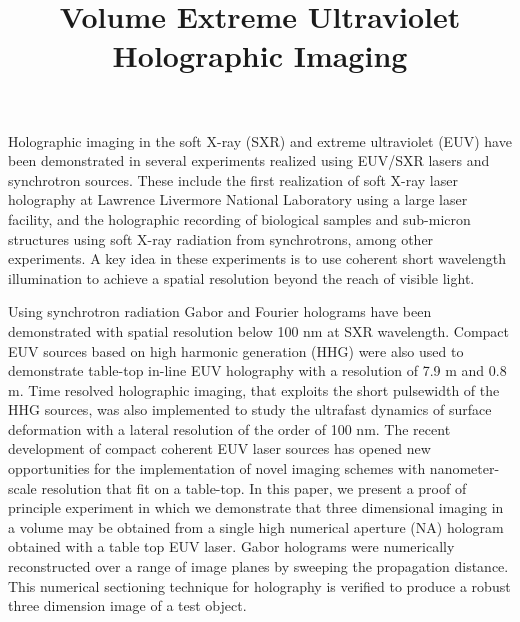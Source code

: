 \documentclass[12pt]{article}
\title{Volume Extreme Ultraviolet Holographic Imaging}
\begin{document}
\maketitle
  Holographic imaging in the soft X-ray \cite{Johansson03compactsoft} (SXR) and extreme ultraviolet (EUV) have been demonstrated in several experiments realized using EUV/SXR lasers and synchrotron sources. These include the first realization of soft X-ray laser holography at Lawrence Livermore National Laboratory using a large laser facility, and the holographic recording of biological samples and sub-micron structures using soft X-ray radiation from synchrotrons, among other experiments.  A key idea in these experiments is to use coherent short wavelength illumination to achieve a spatial resolution \cite{Friedt_spatialresolution} beyond the reach of visible light.  

Using synchrotron radiation Gabor and Fourier holograms have been demonstrated with spatial resolution below 100 nm at SXR wavelength.  Compact EUV sources based on high harmonic generation (HHG) were also used to demonstrate table-top in-line EUV holography with a resolution of 7.9 m and 0.8 m.  Time resolved holographic imaging, that exploits the short pulsewidth of the HHG sources, was also implemented to study the ultrafast dynamics of surface deformation with a lateral resolution of the order of 100 nm.  The recent development of compact coherent EUV laser \cite{Newsroom_testingeuv} sources has opened new opportunities for the implementation of novel imaging schemes with nanometer-scale resolution that fit on a table-top. In this paper, we present a proof of principle experiment in which we demonstrate that three dimensional imaging in a volume may be obtained from a single high numerical  aperture (NA) hologram obtained with a table top EUV laser. Gabor holograms were numerically reconstructed over a range of image planes by sweeping the propagation distance. This numerical sectioning technique for holography is verified to produce a robust three dimension image of a test object. 

 
\end{document}
